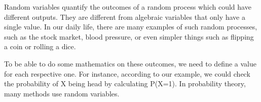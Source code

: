 
Random variables quantify the outcomes of a random process which could have different outputs.
They are different from algebraic variables that only have a single value.
In our daily life, there are many examples of such random processes, such as the stock market,
blood pressure, or even simpler things such as flipping a coin or rolling a dice.

To be able to do some mathematics on these outcomes, we need to define a value for each respective one.
For instance, according to our example, we could check the probability of X being head by calculating P(X=1).
In probability theory, many methods use random variables.

